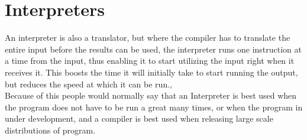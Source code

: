 \section{Interpreters}
An interpreter is also a translator, but where the compiler has to translate the entire input before the results can be used, the interpreter runs one instruction at a time from the input, thus enabling it to start utilizing the input right when it receives it. This boosts the time it will initially take to start running the output, but reduces the speed at which it can be run.,\\
\indent Because of this people would normally say that an Interpreter is best used when the program does not have to be run a great many times, or when the program in under development, and a compiler is best used when releasing large scale distributions of program.